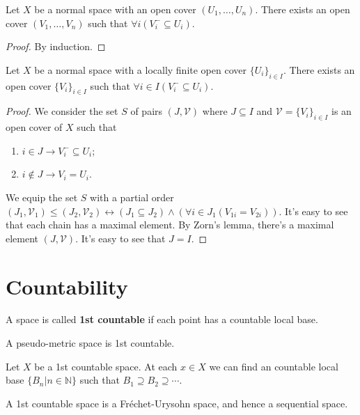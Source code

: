 \documentclass[12pt]{book}
\begin{document}
\begin{lemma}
	Let $X$ be a normal space with an open cover $(U_1,\dots,U_n)$. There exists an open cover $(V_1,\dots,V_n)$ such that $\forall i(V_i^-\subseteq U_i)$.
\end{lemma}
\begin{proof}
	By induction.
\end{proof}

\begin{lemma}
	Let $X$ be a normal space with a locally finite open cover $\{U_i\}_{i\in I}$. There exists an open cover $\{V_i\}_{i\in I}$ such that $\forall i\in I(V_i^-\subseteq U_i)$.
\end{lemma}
\begin{proof}
	We consider the set $S$ of pairs $(J,\mathcal V)$ where $J\subseteq I$ and $\mathcal V=\{V_i\}_{i\in I}$ is an open cover of $X$ such that
	\begin{enumerate}
		\item $i\in J\rightarrow V_i^-\subseteq U_i$;
		\item $i\not\in J\rightarrow V_i=U_i$.
	\end{enumerate}
	
	We equip the set $S$ with a partial order $(J_1,\mathcal V_1)\leq (J_2,\mathcal V_2)\leftrightarrow (J_1\subseteq J_2)\wedge(\forall i\in J_1 (V_{1i}=V_{2i}))$. It's easy to see that each chain has a maximal element. By Zorn's lemma, there's a maximal element $(J,\mathcal V)$. It's easy to see that $J=I$.
\end{proof}
	
\section{Countability}
\begin{definition}
	A space is called {\bf 1st countable} if each point has a countable local base.
\end{definition}

\begin{example}
	A pseudo-metric space is 1st countable.
\end{example}

\begin{lemma}
	Let $X$ be a 1st countable space. At each $x\in X$ we can find an countable local base $\{B_n|n\in\mathbb N\}$ such that $B_1\supseteq B_2\supseteq\cdots$.
\end{lemma}

\begin{corollary}
	A 1st countable space is a Fr\'echet-Urysohn space, and hence a sequential space.
\end{corollary}
\end{document}

